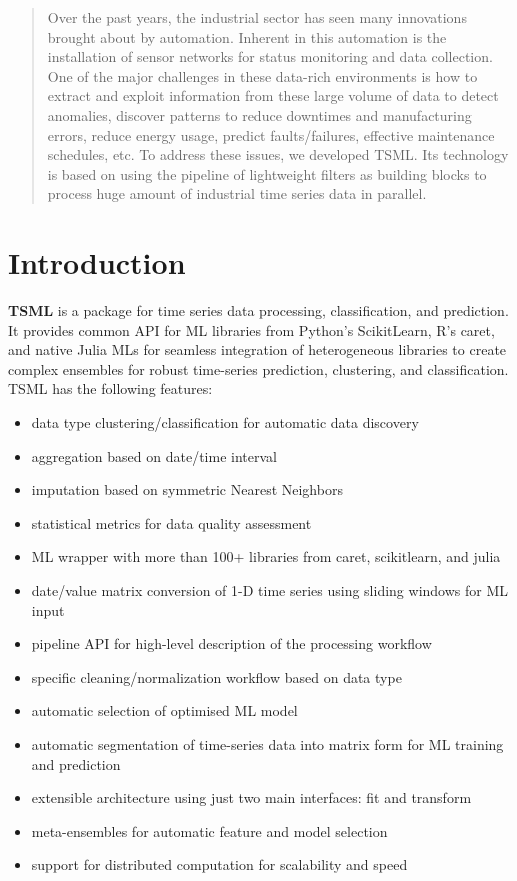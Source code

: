 \documentclass{juliacon}
\begin{document}


\maketitle

\begin{abstract}

  Over the past years, the industrial sector has seen many innovations brought about by automation. 
  Inherent in this automation is the installation of sensor networks for status monitoring and data collection. 
  One of the major challenges in these data-rich environments is how to extract and exploit information from 
  these large volume of data to detect anomalies, discover patterns to reduce downtimes and manufacturing 
  errors, reduce energy usage, predict faults/failures, effective maintenance schedules, etc. 
  To address these issues, we developed TSML. Its technology is based 
  on using the pipeline of lightweight filters as building blocks to process huge amount of industrial time series data in parallel.  

\end{abstract}

\section{Introduction}

\textbf{TSML} is a package for time series data processing, classification, and prediction. 
It provides common API for ML libraries from Python's ScikitLearn, 
R's caret, and native Julia MLs for seamless integration of heterogeneous 
libraries to create complex ensembles for robust time-series prediction, clustering, and classification.
TSML has the following features:
\begin{itemize}
\item data type clustering/classification for automatic data discovery
\item aggregation based on date/time interval
\item imputation based on symmetric Nearest Neighbors
\item statistical metrics for data quality assessment
\item ML wrapper with more than 100+ libraries from caret, scikitlearn, and julia
\item date/value matrix conversion of 1-D time series using sliding windows for ML input
\item pipeline API for high-level description of the processing workflow
\item specific cleaning/normalization workflow based on data type
\item automatic selection of optimised ML model
\item automatic segmentation of time-series data into matrix form for ML training and prediction 
\item extensible architecture using just two main interfaces: fit and transform
\item meta-ensembles for automatic feature and model selection
\item support for distributed computation for scalability and speed
\end{itemize}
\end{document}

